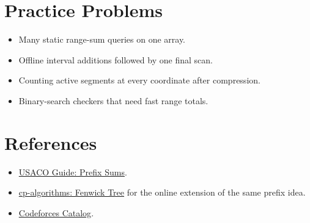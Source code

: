 \section*{Practice Problems}

\begin{itemize}
  \item Many static range-sum queries on one array.
  \item Offline interval additions followed by one final scan.
  \item Counting active segments at every coordinate after compression.
  \item Binary-search checkers that need fast range totals.
\end{itemize}

\section*{References}

\begin{itemize}
  \item \href{https://usaco.guide/silver/prefix-sums}{USACO Guide: Prefix Sums}.
  \item \href{https://cp-algorithms.com/data_structures/fenwick.html}{cp-algorithms: Fenwick Tree} for the online extension of the same prefix idea.
  \item \href{https://codeforces.com/catalog}{Codeforces Catalog}.
\end{itemize}
